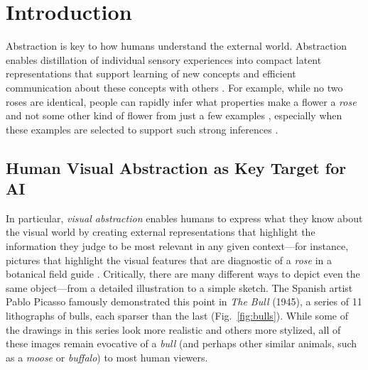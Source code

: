 \documentclass{article}
\begin{document}
\section{Introduction}


Abstraction is key to how humans understand the external world. 
Abstraction enables distillation of individual sensory experiences into compact latent representations that support learning of new concepts \cite{smith2002object, kemp2007learning, murphy2004big, goldstone2013concepts} and efficient communication about these concepts with others \cite{fan2020pragmatic, tessler2019language, hawkins2023visual, gentner2017analogy}.
For example, while no two roses are identical, people can rapidly infer what properties make a flower a \textit{rose} and not some other kind of flower from just a few examples \cite{xu2007word, lake2020people}, especially when these examples are selected to support such strong inferences \cite{gweon2010infants, shafto2014rational}.

\subsection{Human Visual Abstraction as Key Target for AI}
In particular, \textit{visual abstraction} enables humans to express what they know about the visual world by creating external representations that highlight the information they judge to be most relevant in any given context---for instance, pictures that highlight the visual features that are diagnostic of a \textit{rose} in a botanical field guide \cite{fan2018common, fan2020pragmatic, viola2017pondering}. 
Critically, there are many different ways to depict even the same object---from a detailed illustration to a simple sketch. 
The Spanish artist Pablo Picasso famously demonstrated this point in \textit{The Bull} (1945), a series of 11 lithographs of bulls, each sparser than the last (Fig.~\ref{fig:bulls}).
While some of the drawings in this series look more realistic and others more stylized, all of these images remain evocative of a \textit{bull} (and perhaps other similar animals, such as a \textit{moose} or \textit{buffalo}) to most human viewers.
\end{document}
